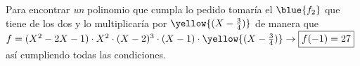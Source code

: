 Para encontrar \textit{un} polinomio que cumpla lo pedido tomaría el $\blue{f_2}$ que tiene  de los dos y lo multiplicaría por
$\yellow{(X - \frac{3}{4})}$ de manera que $f = (X^2 - 2X - 1)\cdot X^2 \cdot (X-2)^3 \cdot (X-1) \cdot \yellow{(X-\frac{3}{4})} \to \boxed{f(-1) = 27}$
así cumpliendo todas las condiciones.
